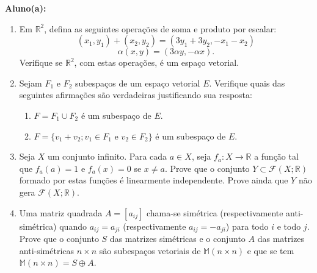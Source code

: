 \documentclass[a4paper,5pt]{amsbook}
\begin{document}
\vspace{0.5cm}
{\bf Aluno(a):}\dotfill{}  %

\vspace{0.2cm}
\begin{enumerate}
	\vspace{0.5cm}
	\item Em $\mathbb{R}^2$, defina as seguintes opera\c{c}\~oes de soma e produto
		por escalar:
		\[(x_1,y_1) + (x_2,y_2) = (3y_1+3y_2, -x_1-x_2)\]
		\[\alpha(x,y) = (3\alpha y, -\alpha x).\]
	Verifique se $\mathbb{R}^2$, com estas opera\c{c}\~oes, \'e um espa\c{c}o vetorial.

	\vspace{0.5cm}
	\item Sejam $F_1$ e $F_2$ subespa\c{c}os de um espa\c{c}o vetorial $E$. Verifique
		quais das seguintes afirma\c{c}\~oes s\~ao verdadeiras justificando sua
		resposta:
		\begin{enumerate}
			\item $F = F_1 \cup F_2$ \'e um subespa\c{c}o de $E$.
			\item $F = \{v_1+v_2; v_1 \in F_1 \text{ e } v_2 \in F_2\}$ \'e um subespa\c{c}o
				de $E$.
		\end{enumerate}

	\vspace{0.5cm}
	\item Seja $X$ um conjunto infinito. Para cada $a \in X$, seja $f_a: X
		\rightarrow \mathbb{R}$ a fun\c{c}\~ao tal que $f_a(a) = 1$ e $f_a(x) = 0$ se
		$x \neq a$. Prove que o conjunto $Y \subset \mathcal{F}(X;\mathbb{R})$
		formado por estas fun\c{c}\~oes \'e linearmente independente. Prove ainda que
		$Y$ n\~ao gera $\mathcal{F}(X;\mathbb{R})$.

	\vspace{0.5cm}
	\item Uma matriz quadrada $A = [a_{ij}]$ chama-se sim\'etrica
		(respectivamente anti-sim\'etrica) quando $a_{ij} = a_{ji}$
		(respectivamente $a_{ij} = -a_{ji}$) para todo $i$ e todo $j$. Prove
		que o conjunto $S$ das matrizes sim\'etricas e o conjunto $A$ das
		matrizes anti-sim\'etricas $n \times n$ s\~ao subespa\c{c}os vetoriais de
		$\mathbb{M}(n \times n)$ e que se tem $\mathbb{M}(n \times n) = S
		\oplus A$.


\end{enumerate}
\end{document}

